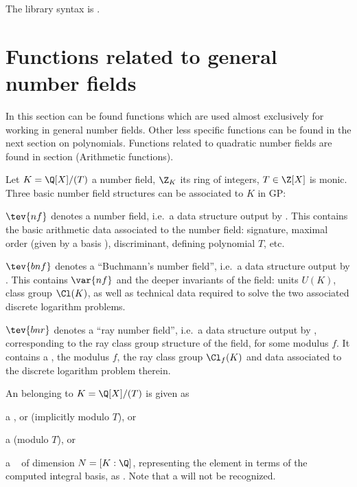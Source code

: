 The library syntax is .

\section{Functions related to general number fields}

In this section can be found functions which are used almost exclusively for
working in general number fields. Other less specific functions can be found
in the next section on polynomials. Functions related to quadratic number
fields are found in section  (Arithmetic functions).


Let $K = \Q[X] / (T)$ a number field, $\Z_K$ its ring of integers, $T\in\Z[X]$
is monic. Three basic number field structures can be associated to $K$ in
GP:

\item $\tev{nf}$ denotes a number field, i.e.~a data structure output by
. This contains the basic arithmetic data associated to the
number field: signature, maximal order (given by a basis ),
discriminant, defining polynomial $T$, etc.

\item $\tev{bnf}$ denotes a ``Buchmann's number field'', i.e.~a
data structure output by . This contains
$\var{nf}$ and the deeper invariants of the field: units $U(K)$, class group
$\Cl(K)$, as well as technical data required to solve the two associated
discrete logarithm problems.

\item $\tev{bnr}$ denotes a ``ray number field'', i.e.~a data structure
output by , corresponding to the ray class group structure of
the field, for some modulus $f$. It contains a , the modulus
$f$, the ray class group $\Cl_f(K)$ and data associated to
the discrete logarithm problem therein.


\noindent An  belonging to $K = \Q[X]/(T)$ is given as

\item a ,  or  (implicitly modulo $T$), or

\item a  (modulo $T$), or

\item a ~ of dimension $N = [K:\Q]$, representing
the element in terms of the computed integral basis, as
. Note that a 
will not be recognized.
\medskip

